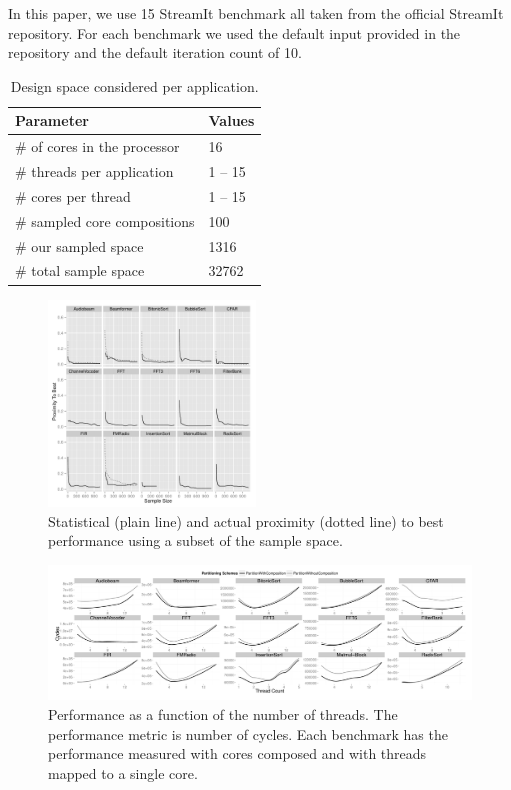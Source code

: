 In this paper, we use 15 StreamIt benchmark  all taken from the official StreamIt repository.
For each benchmark we used the default input provided in the repository and the default iteration count of 10. 
\begin{table}
\centering
\begin{tabular} { p{5.2cm}  p{1.8cm} }
      \toprule
      \textbf{Parameter} & \textbf{Values} \\ \midrule
      \# of cores in the processor & 16 \\
      \# threads per application & 1 -- 15 \\
      \# cores per thread & 1 -- 15 \\ \midrule
      \# sampled core compositions & 100 \\ 
      \# our sampled space & 1316 \\
      \# total sample space & 32762 \\ \bottomrule
    \end{tabular}
  \caption{Design space considered per application.}
  \label{tab:space}
\vspace{5mm}
\end{table}

\begin{figure}[t]
  \centering
    \includegraphics[width=0.49\textwidth]{graphics/ESCProx.pdf}
    \caption{Statistical (plain line) and actual proximity (dotted line) to best performance using a subset of the sample space.}\label{fig:prox}
\end{figure}

\begin{figure}[t]
 \centering
    \includegraphics[width=1\textwidth]{graphics/threadingmaybe.pdf}
    \caption{Performance as a function of the number of threads. The performance metric is number of cycles. Each benchmark has the performance measured with cores composed and with threads mapped to a single core.}\label{fig:threadtrend}
\end{figure}

